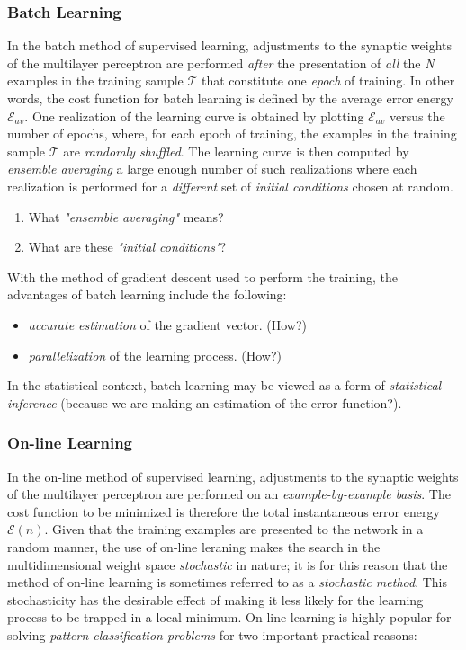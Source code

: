 \documentclass[twocolumn]{article}
\begin{document}
	 \subsubsection{Batch Learning}
		 In the batch method of supervised learning, adjustments to the synaptic weights of the multilayer perceptron are performed \textit{after} the presentation of \textit{all} the \textit{N} examples in the training sample \( \mathcal{T} \) that constitute one \textit{epoch} of training. In other words, the cost function for batch learning is defined by the average error energy $ \mathcal{E}_{av} $. One realization of the learning curve is obtained by plotting $ \mathcal{E}_{av} $ versus the number of epochs, where, for each epoch of training, the examples in the training sample \( \mathcal{T} \) are \textit{randomly shuffled}. The learning curve is then computed by \textit{ensemble averaging} a large enough number of such realizations where each realization is performed for a \textit{different} set of \textit{initial conditions} chosen at random.

		 \begin{enumerate}
			 \item What \textit{"ensemble averaging"} means?
			 \item What are these \textit{"initial conditions"}?
		 \end{enumerate}

		 With the method of gradient descent used to perform the training, the advantages of batch learning include the following:

		 \begin{itemize}
			 \item \textit{accurate estimation} of the gradient vector. (How?)
			 \item \textit{parallelization} of the learning process. (How?)
		 \end{itemize}

		 In the statistical context, batch learning may be viewed as a form of \textit{statistical inference} (because we are making an estimation of the error function?).

	 \subsubsection{On-line Learning}
		 In the on-line method of supervised learning, adjustments to the synaptic weights of the multilayer perceptron are performed on an \textit{example-by-example basis}. The cost function to be minimized is therefore the total instantaneous error energy $ \mathcal{E} (n) $.
		 Given that the training examples are presented to the network in a random manner, the use of on-line leraning makes the search in the multidimensional weight space \textit{stochastic} in nature; it is for this reason that the method of on-line learning is sometimes referred to as a \textit{stochastic method}. This stochasticity has the desirable effect of making it less likely for the learning process to be trapped in a local minimum.
		 On-line learning is highly popular for solving \textit{pattern-classification problems} for two important practical reasons:
\end{document}
